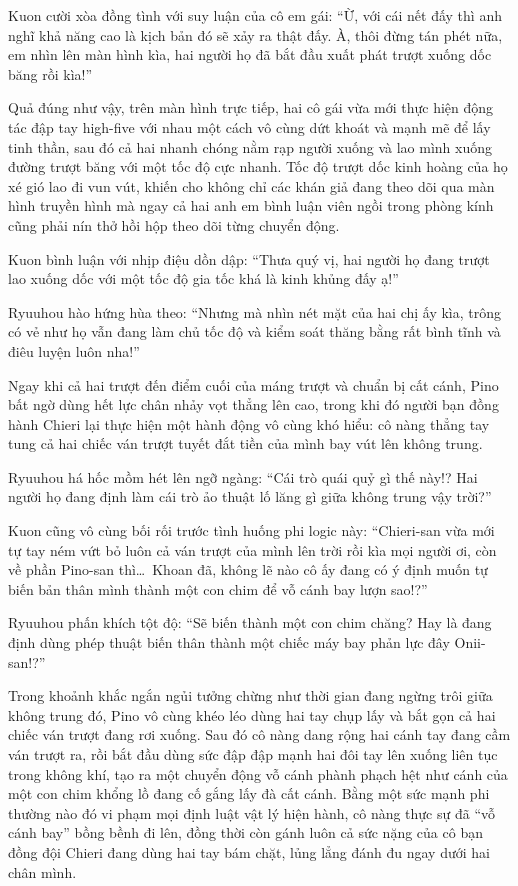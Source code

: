 \documentclass[../main.tex]{subfiles}
\begin{document}
Kuon cười xòa đồng tình với suy luận của cô em gái: ``Ừ, với cái nết đấy thì anh nghĩ khả năng cao là kịch bản đó sẽ xảy ra thật đấy. À, thôi đừng tán phét nữa, em nhìn lên màn hình kìa, hai người họ đã bắt đầu xuất phát trượt xuống dốc băng rồi kìa!''

Quả đúng như vậy, trên màn hình trực tiếp, hai cô gái vừa mới thực hiện động tác đập tay high-five với nhau một cách vô cùng dứt khoát và mạnh mẽ để lấy tinh thần, sau đó cả hai nhanh chóng nằm rạp người xuống và lao mình xuống đường trượt băng với một tốc độ cực nhanh. Tốc độ trượt dốc kinh hoàng của họ xé gió lao đi vun vút, khiến cho không chỉ các khán giả đang theo dõi qua màn hình truyền hình mà ngay cả hai anh em bình luận viên ngồi trong phòng kính cũng phải nín thở hồi hộp theo dõi từng chuyển động.

Kuon bình luận với nhịp điệu dồn dập: ``Thưa quý vị, hai người họ đang trượt lao xuống dốc với một tốc độ gia tốc khá là kinh khủng đấy ạ!''

Ryuuhou hào hứng hùa theo: ``Nhưng mà nhìn nét mặt của hai chị ấy kìa, trông có vẻ như họ vẫn đang làm chủ tốc độ và kiểm soát thăng bằng rất bình tĩnh và điêu luyện luôn nha!''

Ngay khi cả hai trượt đến điểm cuối của máng trượt và chuẩn bị cất cánh, Pino bất ngờ dùng hết lực chân nhảy vọt thẳng lên cao, trong khi đó người bạn đồng hành Chieri lại thực hiện một hành động vô cùng khó hiểu: cô nàng thẳng tay tung cả hai chiếc ván trượt tuyết đắt tiền của mình bay vút lên không trung.

Ryuuhou há hốc mồm hét lên ngỡ ngàng: ``Cái trò quái quỷ gì thế này!? Hai người họ đang định làm cái trò ảo thuật lố lăng gì giữa không trung vậy trời?''

Kuon cũng vô cùng bối rối trước tình huống phi logic này: ``Chieri-san vừa mới tự tay ném vứt bỏ luôn cả ván trượt của mình lên trời rồi kìa mọi người ơi, còn về phần Pino-san thì\dots\ Khoan đã, không lẽ nào cô ấy đang có ý định muốn tự biến bản thân mình thành một con chim để vỗ cánh bay lượn sao!?''

Ryuuhou phấn khích tột độ: ``Sẽ biến thành một con chim chăng? Hay là đang định dùng phép thuật biến thân thành một chiếc máy bay phản lực đây Onii-san!?''

Trong khoảnh khắc ngắn ngủi tưởng chừng như thời gian đang ngừng trôi giữa không trung đó, Pino vô cùng khéo léo dùng hai tay chụp lấy và bắt gọn cả hai chiếc ván trượt đang rơi xuống. Sau đó cô nàng dang rộng hai cánh tay đang cầm ván trượt ra, rồi bắt đầu dùng sức đập đập mạnh hai đôi tay lên xuống liên tục trong không khí, tạo ra một chuyển động vỗ cánh phành phạch hệt như cánh của một con chim khổng lồ đang cố gắng lấy đà cất cánh. Bằng một sức mạnh phi thường nào đó vi phạm mọi định luật vật lý hiện hành, cô nàng thực sự đã ``vỗ cánh bay'' bồng bềnh đi lên, đồng thời còn gánh luôn cả sức nặng của cô bạn đồng đội Chieri đang dùng hai tay bám chặt, lủng lẳng đánh đu ngay dưới hai chân mình.
\end{document}
